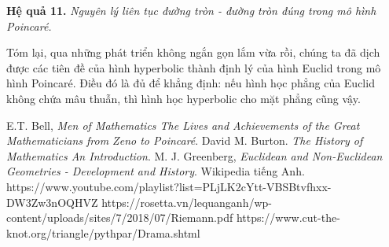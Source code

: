 \textbf{Hệ quả 11.}   \textit{Nguyên lý liên tục đường tròn - đường tròn đúng trong mô hình Poincar\'e.}

Tóm lại, qua những phát triển không ngắn gọn lắm vừa rồi, chúng ta đã dịch được các tiên đề của hình hyperbolic thành định lý của hình Euclid trong mô hình Poincar\'e. Điều đó là đủ để khẳng định: nếu hình học phẳng của Euclid không chứa mâu thuẫn, thì hình học hyperbolic cho mặt phẳng cũng vậy.


\begin{thebibliography}{99}
E.T.  Bell, \textit{Men of Mathematics The Lives and Achievements of the Great Mathematicians from Zeno to Poincaré}.   
 David M. Burton. \textit{The History of Mathematics An Introduction}. 
 M. J. Greenberg, \textit{Euclidean and Non-Euclidean Geometries - Development and History}. 
 Wikipedia tiếng Anh.
 https://www.youtube.com/playlist?list=PLjLK2cYtt-VBSBtvfhxx-DW3Zw3nOQHVZ  
 https://rosetta.vn/lequanganh/wp-content/uploads/sites/7/2018/07/Riemann.pdf 
 https://www.cut-the-knot.org/triangle/pythpar/Drama.shtml
\end{thebibliography} 
	
